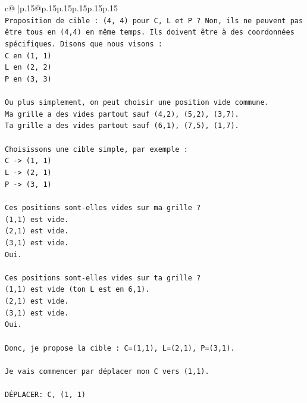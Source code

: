 \documentclass{article}
\begin{document}
{\begin{supertabular}{c@{$\;$}|p{.15\linewidth}@{}p{.15\linewidth}p{.15\linewidth}p{.15\linewidth}p{.15\linewidth}p{.15\linewidth}}
{{{\\ 
\texttt{Proposition de cible : (4, 4) pour C, L et P ? Non, ils ne peuvent pas être tous en (4,4) en même temps. Ils doivent être à des coordonnées spécifiques. Disons que nous visons :} \\
\texttt{C en (1, 1)} \\
\texttt{L en (2, 2)} \\
\texttt{P en (3, 3)} \\
\\ 
\texttt{Ou plus simplement, on peut choisir une position vide commune.} \\
\texttt{Ma grille a des vides partout sauf (4,2), (5,2), (3,7).} \\
\texttt{Ta grille a des vides partout sauf (6,1), (7,5), (1,7).} \\
\\ 
\texttt{Choisissons une cible simple, par exemple :} \\
\texttt{C {-}> (1, 1)} \\
\texttt{L {-}> (2, 1)} \\
\texttt{P {-}> (3, 1)} \\
\\ 
\texttt{Ces positions sont{-}elles vides sur ma grille ?} \\
\texttt{(1,1) est vide.} \\
\texttt{(2,1) est vide.} \\
\texttt{(3,1) est vide.} \\
\texttt{Oui.} \\
\\ 
\texttt{Ces positions sont{-}elles vides sur ta grille ?} \\
\texttt{(1,1) est vide (ton L est en 6,1).} \\
\texttt{(2,1) est vide.} \\
\texttt{(3,1) est vide.} \\
\texttt{Oui.} \\
\\ 
\texttt{Donc, je propose la cible : C=(1,1), L=(2,1), P=(3,1).} \\
\\ 
\texttt{Je vais commencer par déplacer mon C vers (1,1).} \\
\\ 
\texttt{DÉPLACER: C, (1, 1)} \\
            }
        }
    }
     \\ \\


\end{supertabular}}
\end{document}
